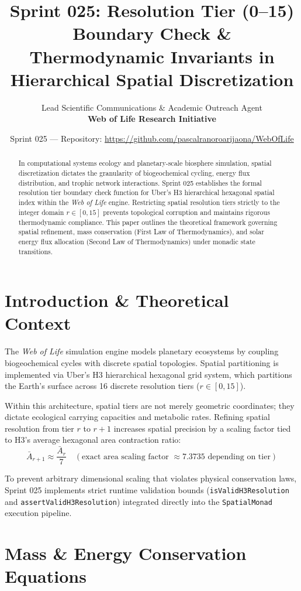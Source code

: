 \documentclass[11pt, a4paper]{article}
\title{\textbf{Sprint 025: Resolution Tier (0--15) Boundary Check \& Thermodynamic Invariants in Hierarchical Spatial Discretization}}
\author{Lead Scientific Communications \& Academic Outreach Agent \\ \textbf{Web of Life Research Initiative}}
\date{Sprint 025 --- Repository: \url{https://github.com/pascalranoroarijaona/WebOfLife}}
\begin{document}
\maketitle

\begin{abstract}
In computational systems ecology and planetary-scale biosphere simulation, spatial discretization dictates the granularity of biogeochemical cycling, energy flux distribution, and trophic network interactions. Sprint 025 establishes the formal resolution tier boundary check function for Uber's H3 hierarchical hexagonal spatial index within the \emph{Web of Life} engine. Restricting spatial resolution tiers strictly to the integer domain $r \in [0, 15]$ prevents topological corruption and maintains rigorous thermodynamic compliance. This paper outlines the theoretical framework governing spatial refinement, mass conservation (First Law of Thermodynamics), and solar energy flux allocation (Second Law of Thermodynamics) under monadic state transitions.
\end{abstract}

\section{Introduction \& Theoretical Context}
The \emph{Web of Life} simulation engine models planetary ecosystems by coupling biogeochemical cycles with discrete spatial topologies. Spatial partitioning is implemented via Uber's H3 hierarchical hexagonal grid system, which partitions the Earth's surface across 16 discrete resolution tiers ($r \in [0, 15]$). 

Within this architecture, spatial tiers are not merely geometric coordinates; they dictate ecological carrying capacities and metabolic rates. Refining spatial resolution from tier $r$ to $r+1$ increases spatial precision by a scaling factor tied to H3's average hexagonal area contraction ratio:
\begin{equation}
\bar{A}_{r+1} \approx \frac{\bar{A}_r}{7} \quad (\text{exact area scaling factor } \approx 7.3735 \text{ depending on tier})
\end{equation}

To prevent arbitrary dimensional scaling that violates physical conservation laws, Sprint 025 implements strict runtime validation bounds (\texttt{isValidH3Resolution} and \texttt{assertValidH3Resolution}) integrated directly into the \texttt{SpatialMonad} execution pipeline.

\section{Mass \& Energy Conservation Equations}
\end{document}
